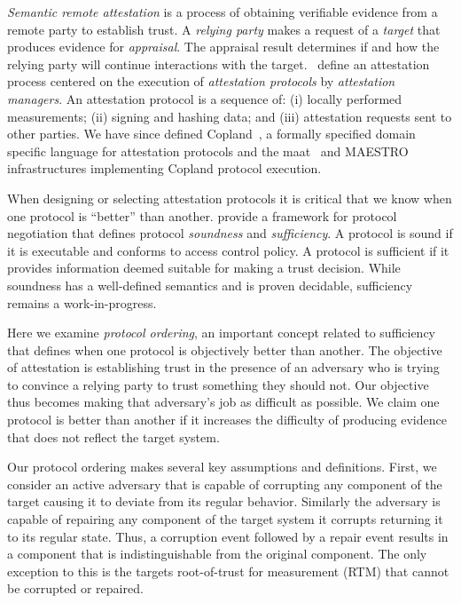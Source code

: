 \documentclass[runningheads]{llncs}
\theoremstyle{definition}
\begin{document}
\emph{Semantic remote
  attestation}\citep{Haldar:04:Semantic-Remote,coker2011principles} is
a process of obtaining verifiable evidence from a remote party to
establish trust.  A \emph{relying party} makes a request of a
\emph{target} that produces evidence for \emph{appraisal}. The
appraisal result determines if and how the relying party will continue
interactions with the target.  \citet{Coker::Principles-of-R}~define
an attestation process centered on the execution of \emph{attestation
  protocols} by \emph{attestation managers}.  An attestation protocol
is a sequence of: (i) locally performed measurements; (ii) signing and
hashing data; and (iii) attestation requests sent to other parties.
We have since defined Copland~\citep{Rowe:2019:Orchestrating}, a
formally specified domain specific language for attestation protocols
and the maat~\citep{Pendergrass:2018:Maat} and
MAESTRO~\citep{Petz:2021:faithful} infrastructures implementing
Copland protocol execution.

When designing or selecting attestation protocols it is critical that
we know when one protocol is ``better'' than another.
\citet{Fritz:2023:framework} provide a framework for protocol
negotiation that defines protocol \emph{soundness} and
\emph{sufficiency}.  A protocol is sound if it is executable and
conforms to access control policy.  A protocol is sufficient if it
provides information deemed suitable for making a trust decision.
While soundness has a well-defined semantics and is proven decidable,
sufficiency remains a work-in-progress.

Here we examine \emph{protocol ordering}, an important concept related
to sufficiency that defines when one protocol is objectively better
than another.  The objective of attestation is establishing trust in
the presence of an adversary who is trying to convince a relying party
to trust something they should not.  Our objective thus becomes making
that adversary's job as difficult as possible. We claim one protocol
is better than another if it increases the difficulty of producing
evidence that does not reflect the target system.

Our protocol ordering makes several key assumptions and
definitions. First, we consider an active adversary that is capable of
corrupting any component of the target causing it to deviate from its
regular behavior.  Similarly the adversary is capable of repairing any
component of the target system it corrupts returning it to its regular
state. Thus, a corruption event followed by a repair event results in
a component that is indistinguishable from the original component. The
only exception to this is the targets root-of-trust for measurement
(RTM) that cannot be corrupted or repaired.
\end{document}

